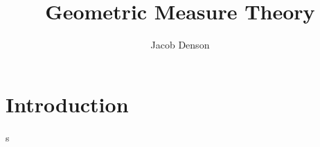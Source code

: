 

\title{Geometric Measure Theory}
\author{Jacob Denson}




\maketitle

\tableofcontents


\chapter{Introduction}

s

\begin{thebibliography}{9}

\end{thebibliography}

